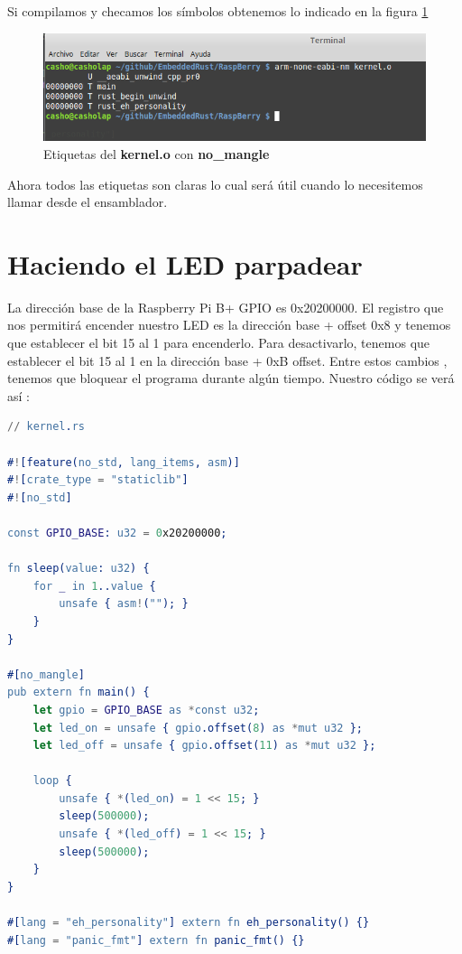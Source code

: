 \documentclass[12pt, twoside]{report}
\begin{document}
Si compilamos y checamos los símbolos obtenemos lo indicado en la figura \ref{fig0004}

\begin{figure}
	\centering	\includegraphics[width=1\linewidth]{rust_kernel4.png}
	\caption{Etiquetas del \textbf{kernel.o} con \textbf{no\_mangle}}
	\label{fig0004}
\end{figure}

Ahora todos las etiquetas son claras lo cual será útil cuando lo necesitemos llamar desde el ensamblador.

\section{Haciendo el LED parpadear}

La dirección base de la Raspberry Pi B+ GPIO es 0x20200000. El registro que nos permitirá encender nuestro LED es la dirección base + offset 0x8 y tenemos que establecer el bit 15 al 1 para encenderlo. Para desactivarlo, tenemos que establecer el bit 15 al 1 en la dirección base + 0xB offset. Entre estos cambios , tenemos que bloquear el programa durante algún tiempo. Nuestro código se verá así :

\begin{lstlisting}[language=erlang]
// kernel.rs

#![feature(no_std, lang_items, asm)]
#![crate_type = "staticlib"]
#![no_std]

const GPIO_BASE: u32 = 0x20200000;

fn sleep(value: u32) {  
    for _ in 1..value {
        unsafe { asm!(""); }
    }
}

#[no_mangle]
pub extern fn main() {  
    let gpio = GPIO_BASE as *const u32;
    let led_on = unsafe { gpio.offset(8) as *mut u32 };
    let led_off = unsafe { gpio.offset(11) as *mut u32 };

    loop {
        unsafe { *(led_on) = 1 << 15; }
        sleep(500000);
        unsafe { *(led_off) = 1 << 15; }
        sleep(500000);
    }
}

#[lang = "eh_personality"] extern fn eh_personality() {}
#[lang = "panic_fmt"] extern fn panic_fmt() {}
\end{lstlisting}
\end{document}
